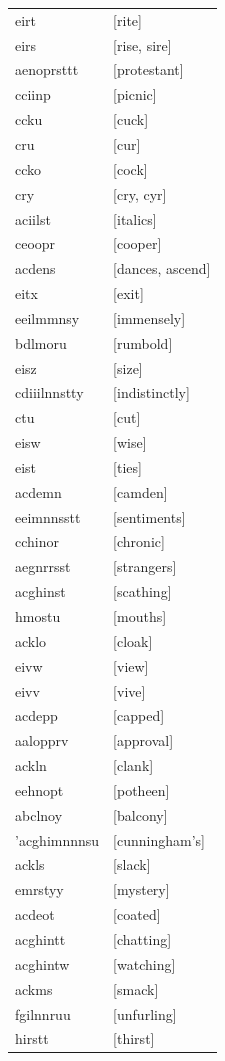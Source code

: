 \documentclass{article}
\begin{document}
\begin{tabular}{ll}
eirt & [rite] \\
eirs & [rise, sire] \\
aenoprsttt & [protestant] \\
cciinp & [picnic] \\
ccku & [cuck] \\
cru & [cur] \\
ccko & [cock] \\
cry & [cry, cyr] \\
aciilst & [italics] \\
ceoopr & [cooper] \\
acdens & [dances, ascend] \\
eitx & [exit] \\
eeilmmnsy & [immensely] \\
bdlmoru & [rumbold] \\
eisz & [size] \\
cdiiilnnstty & [indistinctly] \\
ctu & [cut] \\
eisw & [wise] \\
eist & [ties] \\
acdemn & [camden] \\
eeimnnsstt & [sentiments] \\
cchinor & [chronic] \\
aegnrrsst & [strangers] \\
acghinst & [scathing] \\
hmostu & [mouths] \\
acklo & [cloak] \\
eivw & [view] \\
eivv & [vive] \\
acdepp & [capped] \\
aalopprv & [approval] \\
ackln & [clank] \\
eehnopt & [potheen] \\
abclnoy & [balcony] \\
'acghimnnnsu & [cunningham's] \\
ackls & [slack] \\
emrstyy & [mystery] \\
acdeot & [coated] \\
acghintt & [chatting] \\
acghintw & [watching] \\
ackms & [smack] \\
fgilnnruu & [unfurling] \\
hirstt & [thirst] \\

\end{tabular}
\end{document}
